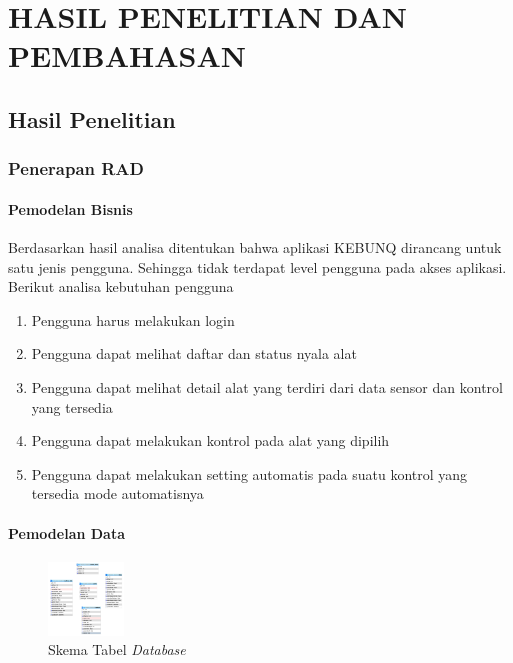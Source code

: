 \chapter{HASIL PENELITIAN DAN PEMBAHASAN}

%
\vspace{4.5pt}
\begin{flushleft}
    \begin{justify}
        \section{Hasil Penelitian}
        \subsection{Penerapan RAD}
        \subsubsection{Pemodelan Bisnis}
        Berdasarkan hasil analisa ditentukan bahwa aplikasi KEBUNQ dirancang untuk satu jenis pengguna. Sehingga tidak terdapat level pengguna pada akses aplikasi.
        Berikut analisa kebutuhan pengguna
        \begin{enumerate}
            \item Pengguna harus melakukan login
            \item Pengguna dapat melihat daftar dan status nyala alat
            \item Pengguna dapat melihat detail alat yang terdiri dari data sensor dan kontrol yang tersedia
            \item Pengguna dapat melakukan kontrol pada alat yang dipilih
            \item Pengguna dapat melakukan setting automatis pada suatu kontrol yang tersedia mode automatisnya\\
        \end{enumerate}
       
        \subsubsection{Pemodelan Data}
        \begin{figure}[ht]
            \centering
            \includegraphics[width=2cm]{images/database.png}
            \caption{Skema Tabel \textit{Database}}
        \end{figure}
\vspace{1cm}
        

\end{justify}
\end{flushleft}
